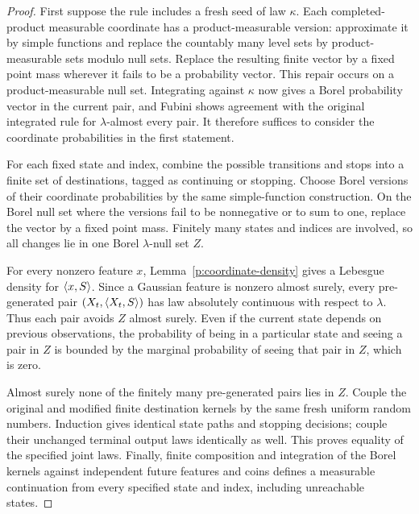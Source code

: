 \begin{proof}
First suppose the rule includes a fresh seed of law \(\kappa\). Each
completed-product measurable coordinate has a product-measurable version:
approximate it by simple functions and replace the countably many level
sets by product-measurable sets modulo null sets. Replace the resulting
finite vector by a fixed point mass wherever it fails to be a probability
vector. This repair occurs on a product-measurable null set. Integrating
against \(\kappa\) now gives a Borel probability vector in the current
pair, and Fubini shows agreement with the original integrated rule for
\(\lambda\)-almost every pair. It therefore suffices to consider the
coordinate probabilities in the first statement.

For each fixed state and index, combine the possible transitions and stops
into a finite set of destinations, tagged as continuing or stopping.
Choose Borel versions of their coordinate probabilities by the same
simple-function construction. On the Borel null set where the versions
fail to be nonnegative or to sum to one, replace the vector by a fixed
point mass. Finitely many states and indices are involved, so all changes
lie in one Borel \(\lambda\)-null set \(Z\).

For every nonzero feature \(x\), Lemma~\ref{p:coordinate-density} gives
a Lebesgue density for \(\langle x,S\rangle\). Since a Gaussian feature is
nonzero almost surely, every pre-generated pair
\((X_t,\langle X_t,S\rangle)\) has law absolutely continuous with respect to
\(\lambda\). Thus each pair avoids \(Z\) almost surely. Even if the
current state depends on previous observations, the probability of being
in a particular state and seeing a pair in \(Z\) is bounded by the
marginal probability of seeing that pair in \(Z\), which is zero.

Almost surely none of the finitely many pre-generated pairs lies in
\(Z\). Couple the original and modified finite destination kernels by
the same fresh uniform random numbers. Induction gives identical state
paths and stopping decisions; couple their unchanged terminal output laws
identically as well. This proves equality of the specified joint laws.
Finally, finite composition and integration of the Borel kernels against
independent future features and coins defines a measurable continuation
from every specified state and index, including unreachable states.
\end{proof}


